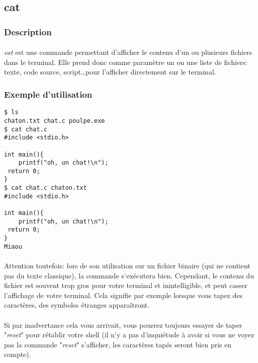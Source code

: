 \subsection{cat}
\subsubsection*{Description}

\paragraph{} \emph{cat} est une commande permettant d'afficher le contenu d'un
ou plusieurs fichiers dans le terminal. Elle prend donc comme paramètre un ou
une liste de fichiers: texte, code source, script\ldots pour l'afficher
directement sur le terminal.

\subsubsection*{Exemple d'utilisation}

\begin{lstlisting}
$ ls
chaton.txt chat.c poulpe.exe
$ cat chat.c
#include <stdio.h>

int main(){
	printf("oh, un chat!\n");
 return 0;
}
$ cat chat.c chaton.txt
#include <stdio.h>

int main(){
	printf("oh, un chat!\n");
 return 0;
}
Miaou
\end{lstlisting}

\paragraph{} Attention toutefois: lors de son utilisation sur un fichier
binaire (qui ne contient pas du texte classique), la commande s'exécutera bien.
Cependant, le contenu du fichier est souvent trop gros pour votre terminal et
inintelligible, et peut casser l'affichage de votre terminal. Cela signifie par
exemple lorsque vous tapez des caractères, des symboles étranges apparaîtront.

\paragraph{} Si par inadvertance cela vous arrivait, vous pourrez toujours
essayer de taper "\emph{reset}" pour rétablir votre shell (il n'y a pas
d'inquiétude à avoir si vous ne voyez pas la commande "\emph{reset}"
s'afficher, les caractères tapés seront bien pris en compte).
